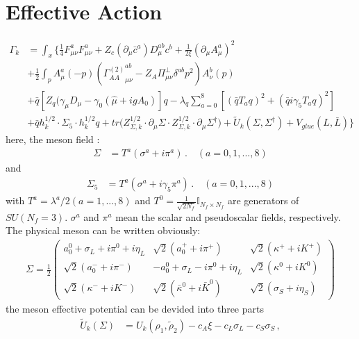 \documentclass[12pt]{article}
\begin{document}
\section{Effective Action}
\begin{align}
\Gamma_k&=\int_x\bigg \{ \frac{1}{4} F_{\mu\nu}^a F_{\mu\nu}^a+Z_c (\partial_\mu \bar c^a) D_{\mu}^{a b} c^{b}+\frac{1}{2\xi}(\partial_\mu A_{\mu}^{a})^2\\ \nonumber
&+\frac{1}{2}\int_p A^a_{\mu}(-p) ({\Gamma_{AA}^{(2)}}_{\mu \nu}^{ab}-Z_A \Pi_{\mu \nu}^{\perp}\delta^{ab} p^2)A _{\nu}^b(p)\\  \nonumber
&+\bar q [Z_q (\gamma_\mu D_\mu-\gamma_0(\hat \mu+ig A_0)]q-\lambda_q \sum_{a=0}^8 [(\bar q T_a  q)^2+(\bar q i \gamma _5 T_a q)^2]\\  \nonumber
&+\bar q  h_{k}^{1/2}  \cdot \Sigma_{5} \cdot h_{k}^{1/2} q+tr \big (Z_{\Sigma,k}^{1/2} \cdot \partial_\mu\Sigma \cdot Z_{\Sigma,k}^{1/2}\cdot \partial_\mu\Sigma^\dagger\bigr) +\tilde U_k(\Sigma,\Sigma^\dagger)+V_{glue}(L,\bar L)
\bigg \}
\end{align}
here, the meson field :
\begin{align}
  \Sigma&=T^a(\sigma^a+i \pi^a)\,. \quad (a=0,1,...,8)\label{}
\end{align}
and 
\begin{align}
  \Sigma_5&=T^a(\sigma^a+i \gamma_5 \pi^a)\,. \quad (a=0,1,...,8)\label{}
\end{align}
with $T^a=\lambda^a/2(a=1,...,8)$ and $T^{0}=\frac{1}{\sqrt{2N_{f}}}\mathbb{I}_{N_{f}\times N_{f}}$ are generators of $SU(N_f=3)$. $\sigma^a$ and $\pi^a$ mean the scalar and pseudoscalar fields, respectively. The physical meson can be written obviously:
\begin{align}
\Sigma=\frac{1}{2}\begin{pmatrix}
a_0^0+\sigma_L+i\pi^0 + i\eta_L& \sqrt{2}(a_0^{+} +i \pi^{+}) & \sqrt{2} (\kappa^{+} +i K^{+})\\
\sqrt{2} (a_0^{-} +i \pi^{-}) & -a_0^0+\sigma_L - i\pi^0  + i\eta_L & \sqrt{2}(\kappa^0+i K^0) \\
\sqrt{2} (\kappa^{-} + i K^{-}) & \sqrt{2} (\bar \kappa^0 + i \bar K^0) & \sqrt{2} (\sigma_S + i \eta_S)\end{pmatrix}\label{eq:mesonmatrix}
\end{align}
the meson effective potential can be devided into three parts
\begin{align}
  \tilde{U}_{k}(\Sigma)&=U_k(\rho_1,\tilde{\rho}_2)-c_A \xi-c_L\sigma_L-c_S\sigma_S\,, \label{eq:tildeU}
\end{align}
\end{document}
